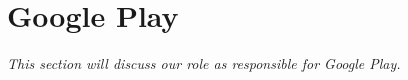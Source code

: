 \section{Google Play} \label{Roles_SecGooglePlay}
\textit{This section will discuss our role as responsible for Google Play.}